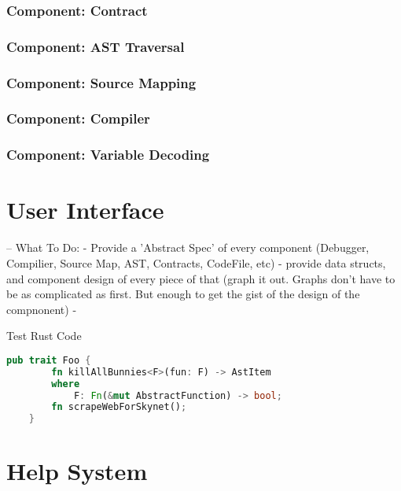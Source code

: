 \documentclass{report}
\begin{document}
    \subsubsection{Component: Contract}
    \subsubsection{Component: AST Traversal}
    \subsubsection{Component: Source Mapping}
    \subsubsection{Component: Compiler}
    \subsubsection{Component: Variable Decoding}

\section{User Interface}

-- What To Do:
    - Provide a 'Abstract Spec' of every component (Debugger, Compilier, Source Map, AST, Contracts, CodeFile, etc)
        - provide data structs, and component design of every piece of that (graph it out. Graphs don't have to be as complicated as first. But enough to get the gist of the design of the compnonent)
        -

Test Rust Code
\begin{lstlisting}[language=Rust]
    pub trait Foo {
        fn killAllBunnies<F>(fun: F) -> AstItem
        where
            F: Fn(&mut AbstractFunction) -> bool;
        fn scrapeWebForSkynet();
    }
\end{lstlisting}
\section{Help System}

\section{}
\end{document}
